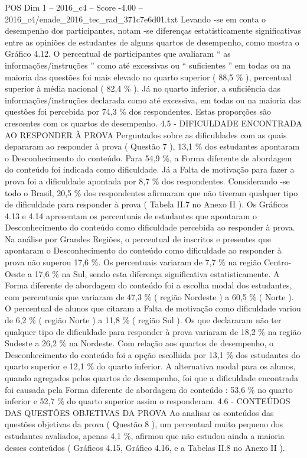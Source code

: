 \begin{textsample}{POS Dim 1 – 2016\_c4 – Score -4.00 – 2016\_c4/enade\_2016\_tec\_rad\_371c7e6d01.txt}
Levando -se em conta o desempenho dos participantes, notam -se diferenças estatisticamente significativas entre as opiniões de estudantes de alguns quartos de desempenho, como mostra o Gráfico 4.12.
O percentual de participantes que avaliaram “ as informações/instruções ” como até excessivas ou “ suficientes ” em todas ou na maioria das questões foi mais elevado no quarto superior ( 88,5 \% ), percentual superior à média nacional ( 82,4 \% ).
Já no quarto inferior, a suficiência das informações/instruções declarada como até excessiva, em todas ou na maioria das questões foi percebida por 74,3 \% dos respondentes.
Estas proporções são crescentes com os quartos de desempenho. 4.5 - DIFICULDADE ENCONTRADA AO RESPONDER À PROVA Perguntados sobre as dificuldades com as quais depararam ao responder à prova ( Questão 7 ), 13,1 \% dos estudantes apontaram o Desconhecimento do conteúdo.
Para 54,9 \%, a Forma diferente de abordagem do conteúdo foi indicada como dificuldade.
Já a Falta de motivação para fazer a prova foi a dificuldade apontada por 8,7 \% dos respondentes.
Considerando -se todo o Brasil, 20,5 \% dos respondentes afirmaram que não tiveram qualquer tipo de dificuldade para responder à prova ( Tabela II.7 no Anexo II ).
Os Gráficos 4.13 e 4.14 apresentam os percentuais de estudantes que apontaram o Desconhecimento do conteúdo como dificuldade percebida ao responder à prova.
Na análise por Grandes Regiões, o percentual de inscritos e presentes que apontaram o Desconhecimento do conteúdo como dificuldade ao responder à prova não superou 17,6 \%.
Os percentuais variaram de 7,7 \% na região Centro-Oeste a 17,6 \% na Sul, sendo esta diferença significativa estatisticamente.
A Forma diferente de abordagem do conteúdo foi a escolha modal dos estudantes, com percentuais que variaram de 47,3 \% ( região Nordeste ) a 60,5 \% ( Norte ).
O percentual de alunos que citaram a Falta de motivação como dificuldade variou de 6,2 \% ( região Norte ) a 11,8 \% ( região Sul ).
Os que declararam não ter qualquer tipo de dificuldade para responder à prova variaram de 18,2 \% na região Sudeste a 26,2 \% na Nordeste.
Com relação aos quartos de desempenho, o Desconhecimento do conteúdo foi a opção escolhida por 13,1 \% dos estudantes do quarto superior e 12,1 \% do quarto inferior.
A alternativa modal para os alunos, quando agregados pelos quartos de desempenho, foi que a dificuldade encontrada foi causada pela Forma diferente de abordagem do conteúdo : 53,6 \% no quarto inferior e 52,7 \% do quarto superior assim o responderam. 4.6 - CONTEÚDOS DAS QUESTÕES OBJETIVAS DA PROVA Ao analisar os conteúdos das questões objetivas da prova ( Questão 8 ), um percentual muito pequeno dos estudantes avaliados, apenas 4,1 \%, afirmou que não estudou ainda a maioria desses conteúdos ( Gráficos 4.15, Gráfico 4.16, e a Tabelas II.8 no Anexo II ).

\end{textsample}
